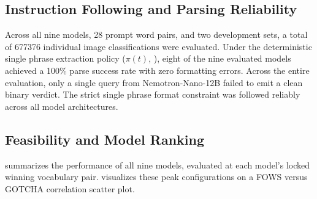 \subsection{Instruction Following and Parsing Reliability}
\label{subsec:stage1_reliability}

Across all nine models, 28 prompt word pairs, and two development sets, a total of \num{677376} individual image classifications were evaluated. Under the deterministic single phrase extraction policy ($\pi(t)$, ), eight of the nine evaluated models achieved a \num{100}\% parse success rate with zero formatting errors. Across the entire evaluation, only a single query from Nemotron-Nano-12B failed to emit a clean binary verdict. The strict single phrase format constraint was followed reliably across all model architectures.

\subsection{Feasibility and Model Ranking}
\label{subsec:stage1_feasibility}

 summarizes the performance of all nine models, evaluated at each model's locked winning vocabulary pair.  visualizes these peak configurations on a FOWS versus GOTCHA correlation scatter plot.

